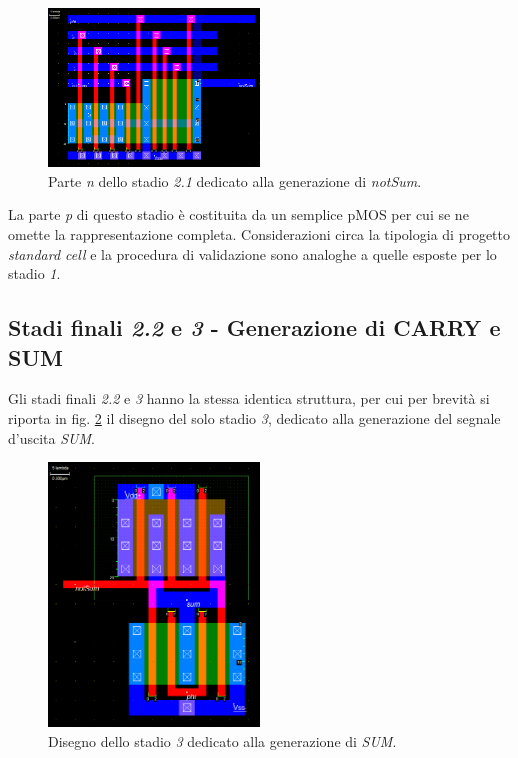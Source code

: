 \begin{figure}[hbt!]
	\centering
	\includegraphics[width=0.5\textwidth]{figure/Msk_NMOS_NotSum.png}
	\caption{Parte \textit{n} dello stadio \textit{2.1} dedicato alla generazione di \textit{notSum}.}
	\label{fig:NMOSnotSum}
\end{figure} 

La parte \textit{p} di questo stadio è costituita da un semplice pMOS per cui se ne omette la rappresentazione completa. Considerazioni circa la tipologia di progetto \textit{standard cell} e la procedura di validazione sono analoghe a quelle esposte per lo stadio \textit{1}.

\subsection{Stadi finali \textit{2.2} e \textit{3} - Generazione di CARRY e SUM}

Gli stadi finali \textit{2.2} e \textit{3} hanno la stessa identica struttura, per cui per brevità si riporta in fig. \ref{fig:sum} il disegno del solo stadio \textit{3}, dedicato alla generazione del segnale d'uscita \textit{SUM}.

\begin{figure}[hbt!]
	\centering
	\includegraphics[width=0.5\textwidth]{figure/Msk_SumInveter.png}
	\caption{Disegno dello stadio \textit{3} dedicato alla generazione di \textit{SUM}.}
	\label{fig:sum}
\end{figure} 

